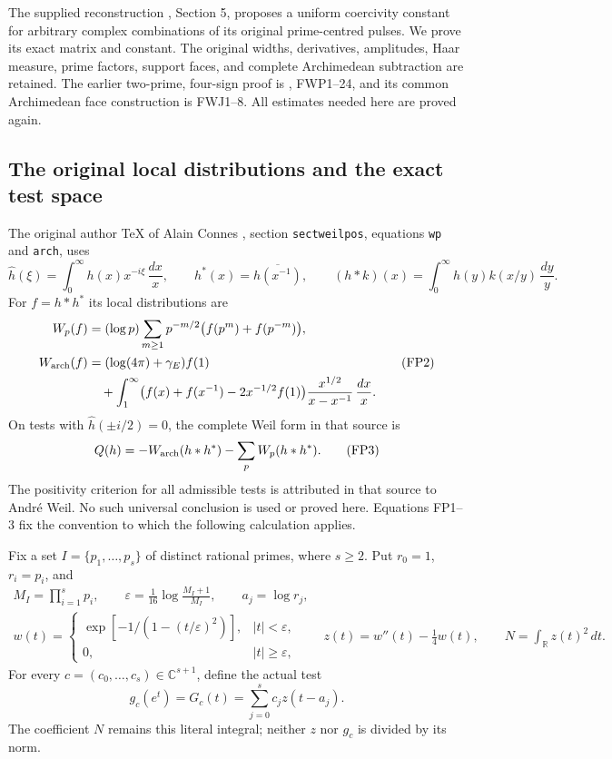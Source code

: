 \documentclass[11pt,a4paper]{article}
\theoremstyle{definition}\newtheorem{definition}[theorem]{Definition}
\newcommand{\C}{\mathbb C}\newcommand{\R}{\mathbb R}
\begin{document}
The supplied reconstruction \cite{FullSupportIntake}, Section 5, proposes a
uniform coercivity constant for arbitrary complex combinations of
its original prime-centred pulses. We prove its exact matrix and
constant. The original widths, derivatives, amplitudes, Haar measure,
prime factors, support faces, and complete Archimedean subtraction
are retained. The earlier two-prime, four-sign proof is
\cite{Edition033}, FWP1--24, and its common Archimedean face construction
is FWJ1--8. All estimates needed here are proved again.

\subsection{The original local distributions and the exact test space}

The original author TeX of Alain Connes \cite{Connes2026}, section
\texttt{sectweilpos}, equations \texttt{wp} and \texttt{arch}, uses
\[
 \widehat h(\xi)=\int_0^\infty h(x)x^{-i\xi}\,\frac{dx}{x},
 \qquad h^*(x)=\overline{h(x^{-1})},\qquad
 (h*k)(x)=\int_0^\infty h(y)k(x/y)\,\frac{dy}{y}.
 \tag{FP1}\label{fp:fpb:conventions}
\]
For \(f=h*h^*\) its local distributions are
\[
 \begin{aligned}
 W_p(f)&=(\log p)\sum_{m\ge1}p^{-m/2}
                              \bigl(f(p^m)+f(p^{-m})\bigr),\\
 W_{\rm arch}(f)&=(\log(4\pi)+\gamma_E)f(1)\\
 &\quad+\int_1^\infty
 \bigl(f(x)+f(x^{-1})-2x^{-1/2}f(1)\bigr)
                    \frac{x^{1/2}}{x-x^{-1}}\,\frac{dx}{x}.
 \end{aligned}
 \tag{FP2}\label{fp:fpb:local}
\]
On tests with \(\widehat h(\pm i/2)=0\), the complete Weil form
in that source is
\[
 Q(h)=-W_{\rm arch}(h*h^*)-\sum_pW_p(h*h^*).
 \tag{FP3}
\]
The positivity criterion for all admissible tests is attributed
in that source to Andr\'e Weil. No such universal conclusion is
used or proved here. Equations FP1--3 fix the convention to which
the following calculation applies.

Fix a set \(I=\{p_1,\ldots,p_s\}\) of distinct rational primes,
where \(s\ge2\). Put \(r_0=1\), \(r_i=p_i\), and
\[
 \begin{gathered}
 M_I=\prod_{i=1}^s p_i,\qquad
 \varepsilon=\frac1{16}\log\frac{M_I+1}{M_I},\qquad a_j=\log r_j,\\
 w(t)=
 \begin{cases}
 \exp[-1/(1-(t/\varepsilon)^2)],& |t|<\varepsilon,\\
 0,& |t|\ge\varepsilon,
 \end{cases}
 \qquad z(t)=w''(t)-\frac14w(t),\qquad
 N=\int_{\R}z(t)^2\,dt .
 \end{gathered}
 \tag{FP4}\label{fp:fpb:pulse}
\]
For every \(c=(c_0,\ldots,c_s)\in\C^{s+1}\), define the actual test
\[
 g_c(e^t)=G_c(t)=\sum_{j=0}^s c_jz(t-a_j).
 \tag{FP5}\label{fp:fpb:test}
\]
The coefficient \(N\) remains this literal integral; neither \(z\)
nor \(g_c\) is divided by its norm.
\end{document}
